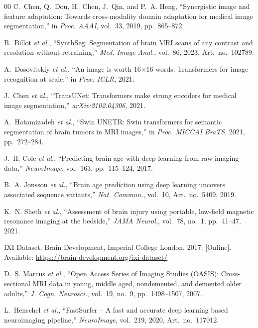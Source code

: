 \documentclass[12pt,a4paper]{article}
\begin{document}
\begin{thebibliography}{00}
C.~Chen, Q.~Dou, H.~Chen, J.~Qin, and P.~A. Heng,
``Synergistic image and feature adaptation: Towards cross-modality
domain adaptation for medical image segmentation,''
in \emph{Proc. AAAI}, vol.~33, 2019, pp.~865--872.

B.~Billot \emph{et al.},
``SynthSeg: Segmentation of brain MRI scans of any contrast and
resolution without retraining,''
\emph{Med. Image Anal.}, vol.~86, 2023, Art.~no.~102789.

A.~Dosovitskiy \emph{et al.},
``An image is worth 16$\times$16 words: Transformers for image
recognition at scale,''
in \emph{Proc. ICLR}, 2021.

J.~Chen \emph{et al.},
``TransUNet: Transformers make strong encoders for medical image
segmentation,''
\emph{arXiv:2102.04306}, 2021.

A.~Hatamizadeh \emph{et al.},
``Swin UNETR: Swin transformers for semantic segmentation of brain
tumors in MRI images,''
in \emph{Proc. MICCAI BraTS}, 2021, pp.~272--284.

J.~H. Cole \emph{et al.},
``Predicting brain age with deep learning from raw imaging data,''
\emph{NeuroImage}, vol.~163, pp.~115--124, 2017.

B.~A. Jonsson \emph{et al.},
``Brain age prediction using deep learning uncovers associated
sequence variants,''
\emph{Nat. Commun.}, vol.~10, Art.~no.~5409, 2019.

K.~N. Sheth \emph{et al.},
``Assessment of brain injury using portable, low-field magnetic resonance
imaging at the bedside,''
\emph{JAMA Neurol.}, vol.~78, no.~1, pp.~41--47, 2021.

IXI Dataset, Brain Development, Imperial College London, 2017.
[Online]. Available: \url{https://brain-development.org/ixi-dataset/}

D.~S. Marcus \emph{et al.},
``Open Access Series of Imaging Studies (OASIS): Cross-sectional MRI
data in young, middle aged, nondemented, and demented older adults,''
\emph{J. Cogn. Neurosci.}, vol.~19, no.~9, pp.~1498--1507, 2007.

L.~Henschel \emph{et al.},
``FastSurfer -- A fast and accurate deep learning based neuroimaging
pipeline,''
\emph{NeuroImage}, vol.~219, 2020, Art.~no.~117012.


\end{thebibliography}
\end{document}
